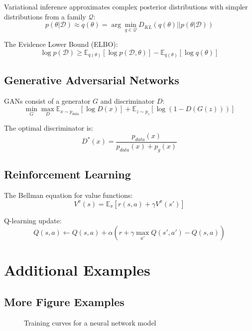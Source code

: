 \documentclass{article}
\begin{document}
Variational inference approximates complex posterior distributions with
simpler distributions from a family $\mathcal{Q}$:
\[
p(\theta|\mathcal{D}) \approx q(\theta) = \arg\min_{q \in \mathcal{Q}} D_{KL}(q(\theta)||p(\theta|\mathcal{D}))
\]

The Evidence Lower Bound (ELBO):
\[
\log p(\mathcal{D}) \geq \mathbb{E}_{q(\theta)}[\log p(\mathcal{D},\theta)] - \mathbb{E}_{q(\theta)}[\log q(\theta)]
\]

\subsection{Generative Adversarial Networks}

GANs consist of a generator $G$ and discriminator $D$:
\[
\min_G \max_D \mathbb{E}_{x \sim p_{data}}[\log D(x)] + \mathbb{E}_{z \sim p_z}[\log (1 - D(G(z)))]
\]

The optimal discriminator is:
\[
D^*(x) = \frac{p_{data}(x)}{p_{data}(x) + p_g(x)}
\]

\subsection{Reinforcement Learning}

The Bellman equation for value functions:
\[
V^\pi(s) = \mathbb{E}_\pi [r(s,a) + \gamma V^\pi(s')]
\]

Q-learning update:
\[
Q(s,a) \leftarrow Q(s,a) + \alpha \left( r + \gamma \max_{a'} Q(s',a') - Q(s,a) \right)
\]

\section{Additional Examples}

\subsection{More Figure Examples}

\begin{figure}[h]
\centering
{}
\caption{Training curves for a neural network model}
\label{fig:training_curves}
\end{figure}
\end{document}
